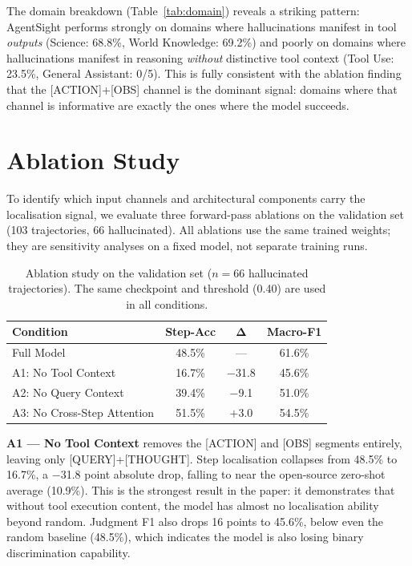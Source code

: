\documentclass[11pt]{article}
\begin{document}
The domain breakdown (Table~\ref{tab:domain}) reveals a striking pattern: AgentSight performs strongly on domains where hallucinations manifest in tool \emph{outputs} (Science: 68.8\%, World Knowledge: 69.2\%) and poorly on domains where hallucinations manifest in reasoning \emph{without} distinctive tool context (Tool Use: 23.5\%, General Assistant: 0/5). This is fully consistent with the ablation finding that the [ACTION]+[OBS] channel is the dominant signal: domains where that channel is informative are exactly the ones where the model succeeds.

\section{Ablation Study}
\label{sec:ablation}

To identify which input channels and architectural components carry the localisation signal, we evaluate three forward-pass ablations on the validation set (103 trajectories, 66 hallucinated). All ablations use the same trained weights; they are sensitivity analyses on a fixed model, not separate training runs.

\begin{table}[h]
\centering
\caption{Ablation study on the validation set ($n{=}66$ hallucinated trajectories). The same checkpoint and threshold (0.40) are used in all conditions.}
\label{tab:ablation}
\begin{tabular}{lccc}
\toprule
\textbf{Condition} & \textbf{Step-Acc} & $\boldsymbol{\Delta}$ & \textbf{Macro-F1} \\
\midrule
Full Model                          & 48.5\% & --- & 61.6\% \\
\quad A1: No Tool Context           & 16.7\% & $-$31.8 & 45.6\% \\
\quad A2: No Query Context          & 39.4\% & $-$9.1  & 51.0\% \\
\quad A3: No Cross-Step Attention   & 51.5\% & $+$3.0  & 54.5\% \\
\bottomrule
\end{tabular}
\end{table}

\textbf{A1 — No Tool Context} removes the [ACTION] and [OBS] segments entirely, leaving only [QUERY]+[THOUGHT]. Step localisation collapses from 48.5\% to 16.7\%, a $-$31.8 point absolute drop, falling to near the open-source zero-shot average (10.9\%). This is the strongest result in the paper: it demonstrates that without tool execution content, the model has almost no localisation ability beyond random. Judgment F1 also drops 16 points to 45.6\%, below even the random baseline (48.5\%), which indicates the model is also losing binary discrimination capability.
\end{document}

